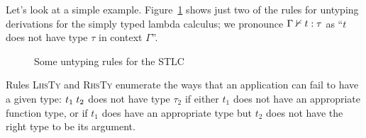 \documentclass[sigplan, screen]{acmart}\settopmatter{printccs=false,printacmref=false}
\begin{document}
Let's look at a simple example.  Figure~\ref{fig:untyping-STLC}
shows just two of the rules for untyping derivations for the simply typed
lambda calculus; we pronounce ${\Gamma} \nvdash {t} : {\tau}$ as ``$t$ does
not have type $\tau$ in context $\Gamma$''.
\begin{figure}
  \caption{Some untyping rules for the STLC} \label{fig:untyping-STLC}
\end{figure}
Rules \textsc{LhsTy\frownie{}} and \textsc{RhsTy\frownie{}} enumerate
the ways that an application can fail to have a given type:
${t_1}\; {t_2}$ does not have type $\tau_2$ if either $t_1$ does not
have an appropriate function type, or if $t_1$ does have an
appropriate type but $t_2$ does not have the right type to be its
argument.
\end{document}
